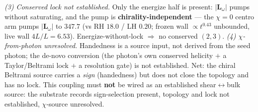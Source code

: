 \begin{description}
    \emph{(3) Conserved lock not established.} Only the energize half is present: $|\mathbf{L}_\omega|$ pumps without saturating, and the pump is \textbf{chirality-independent} --- the $\chi=0$ centro arm pumps $|\mathbf{L}_\omega|$ to $347.7$ (vs RH $18.0$ / LH $0.20$; frozen wall $\propto t^{0.43}$ unbounded, live wall $4L/L=6.53$). Energize-without-lock $\Rightarrow$ no conserved $(2,3)$.
    \emph{(4) $\chi$-from-photon unresolved.} Handedness is a source input, not derived from the seed photon; the de-novo conversion (the photon's own conserved helicity $+$ a Taylor/Beltrami lock $+$ a resolution gate) is not established.
    Net: the chiral Beltrami source carries a \emph{sign} (handedness) but does not close the topology and has no lock. This coupling must \textbf{not} be wired as an established shear$\leftrightarrow$bulk source: the substrate records sign-selection present, topology and lock not established, $\chi$-source unresolved.
\end{description}


